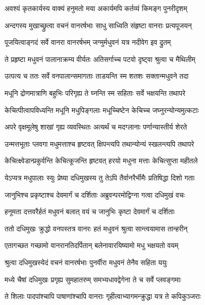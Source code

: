 \twolineshloka
{अवश्यं कृतकार्यस्य वाक्यं हनुमतो मया}
{अकार्यमपि कर्तव्यं किमङ्ग पुनरीदृशम्} %

\twolineshloka
{अन्दगस्य मुखाच्छ्रुत्वा वचनं वानरर्षभाः}
{साधु साध्विति संहृष्टा वानराः प्रत्यपूजयन्} %

\twolineshloka
{पूजयित्वाङ्गदं सर्वे वानरा वानरर्षभम्}
{जग्मुर्मधुवनं यत्र नदीवेग इव द्रुतम्} %

\twolineshloka
{ते प्रहृष्टा मधुवनं पालानाक्रम्य वीर्यतः}
{अतिसर्गाच्च पटवो दृष्ट्वा श्रुत्वा च मैथिलीम्} %

\twolineshloka
{उत्पत्य च ततः सर्वे वनपालान्समागताः}
{ताडयन्ति स्म शतशः सक्तान्मधुवने तदा} %

\twolineshloka
{मधूनि द्रोणमात्राणि बहुभिः परिगृह्य ते}
{घ्नन्ति स्म सहिताः सर्वे भक्षयन्ति तथापरे} %

\twolineshloka
{केचित्पीत्वापविध्यन्ति मधूनि मधुपिङ्गलाः}
{मधूच्चिष्टेन केचिच्च जघ्नुरन्योन्यमुत्कटाः} %

\twolineshloka
{अपरे वृक्षमूलेषु शाखां गृह्य व्यवस्थितः}
{अत्यर्थं च मदग्लानाः पर्णान्यास्तीर्य शेरते} %

\twolineshloka
{उन्मत्तभूताः प्लवगा मधुमत्ताश्च हृष्टवत्}
{क्षिपन्त्यपि तथान्योन्यं स्खलन्त्यपि तथापरे} %

\twolineshloka
{केचित्क्ष्वेडान्प्रकुर्वन्ति केचित्कूजन्ति हृष्टवत्}
{हरयो मधुना मत्ताः केचित्सुप्ता महीतले} %

\twolineshloka
{येऽप्यत्र मधुपालाः स्युः प्रेष्या दधिमुखस्य तु}
{तेऽपि तैर्वानरैर्भीमैः प्रतिषिद्धा दिशो गताः} %

\twolineshloka
{जानुभिश्च प्रकृष्टाश्च देवमार्गं च दर्शिताः}
{अब्रुवन्परमोद्विग्ना गत्वा दधिमुखं वचः} %

\twolineshloka
{हनूमता दत्तवरैर्हतं मधुवनं बलात्}
{वयं च जानुभिः कृष्टा देवमार्गं च दर्शिताः} %

\twolineshloka
{ततो दधिमुखः क्रुद्धो वनपस्तत्र वानरः}
{हतं मधुवनं श्रुत्वा सान्त्वयामास तान्हरीन्} %

\twolineshloka
{एतागच्छत गच्छामो वानरानतिदर्पितान्}
{बलेनावारयिष्यामो मधु भक्षयतो वयम्} %

\twolineshloka
{श्रुत्वा दधिमुखस्येदं वचनं वानरर्षभाः}
{पुनर्वीरा मधुवनं तेनैव सहिता ययुः} %

\twolineshloka
{मध्ये चैषां दधिमुखः प्रगृह्य सुमहातरुम्}
{समभ्यधावद्वेगेना ते च सर्वे प्लवङ्गमाः} %

\twolineshloka
{ते शिलाः पादपांश्चापि पाषाणांश्चापि वानराः}
{गृहीत्वाभ्यागमन्क्रुद्धा यत्र ते कपिकुञ्जराः} %

